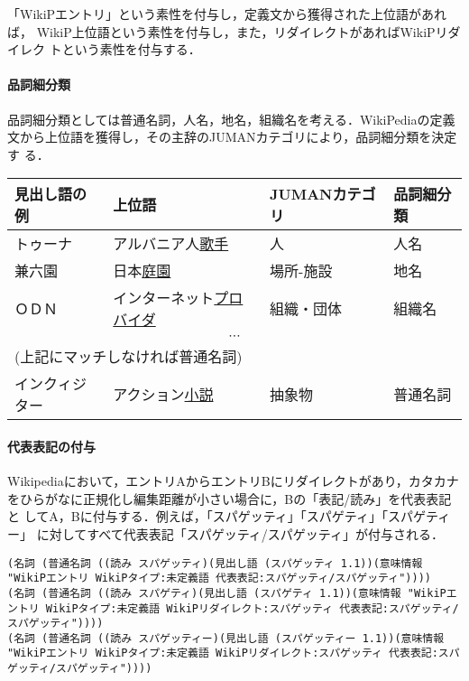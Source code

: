 \documentclass[a4j,titlepage]{jarticle}
\begin{document}
「WikiPエントリ」という素性を付与し，定義文から獲得された上位語があれば，
WikiP上位語という素性を付与し，また，リダイレクトがあればWikiPリダイレク
トという素性を付与する．

\paragraph{品詞細分類}

品詞細分類としては普通名詞，人名，地名，組織名を考える．WikiPediaの定義
文から上位語を獲得し，その主辞のJUMANカテゴリにより，品詞細分類を決定す
る．

\begin{center}
\begin{tabular}{llll}\hline
見出し語の例 & 上位語 & JUMANカテゴリ & 品詞細分類 \\\hline
トゥーナ & アルバニア人\underline{歌手} & 人 & 人名 \\
兼六園 & 日本\underline{庭園} & 場所-施設 & 地名\\ 
ＯＤＮ & インターネット\underline{プロバイダ} & 組織・団体 & 組織名  \\
\multicolumn{4}{c}{$\cdots$}\\
\multicolumn{4}{l}{(上記にマッチしなければ普通名詞)}\\
インクィジター & アクション\underline{小説} & 抽象物 & 普通名詞  \\
\hline
 \end{tabular}
\end{center}

\paragraph{代表表記の付与}

Wikipediaにおいて，エントリAからエントリBにリダイレクトがあり，カタカナ
をひらがなに正規化し編集距離が小さい場合に，Bの「表記/読み」を代表表記と
してA，Bに付与する．例えば，「スパゲッティ」「スパゲティ」「スパゲティー」
に対してすべて代表表記「スパゲッティ/スパゲッティ」が付与される．

\begin{verbatim}
(名詞 (普通名詞 ((読み スパゲッティ)(見出し語 (スパゲッティ 1.1))(意味情報 "WikiPエントリ WikiPタイプ:未定義語 代表表記:スパゲッティ/スパゲッティ"))))
(名詞 (普通名詞 ((読み スパゲティ)(見出し語 (スパゲティ 1.1))(意味情報 "WikiPエントリ WikiPタイプ:未定義語 WikiPリダイレクト:スパゲッティ 代表表記:スパゲッティ/スパゲッティ"))))
(名詞 (普通名詞 ((読み スパゲッティー)(見出し語 (スパゲッティー 1.1))(意味情報 "WikiPエントリ WikiPタイプ:未定義語 WikiPリダイレクト:スパゲッティ 代表表記:スパゲッティ/スパゲッティ"))))
\end{verbatim}
\end{document}
